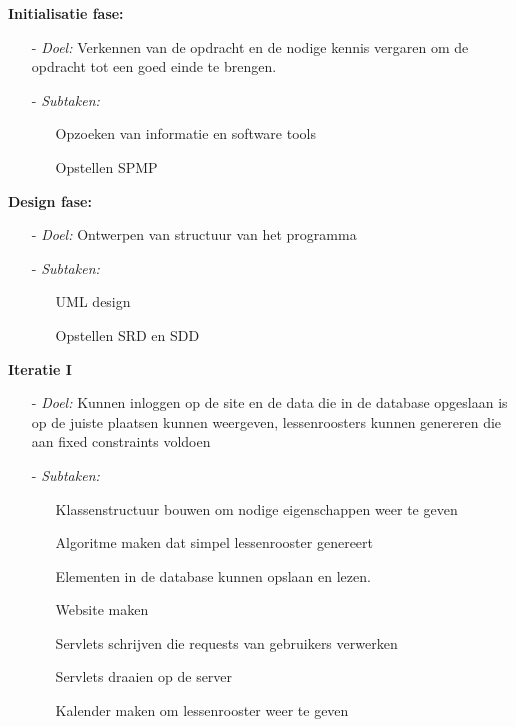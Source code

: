 \documentclass{article}
\begin{document}
\textbf{Initialisatie fase:}
\begin{itemize}
\item[-] \textit{Doel:} Verkennen van de opdracht en de nodige kennis vergaren om de opdracht tot een goed einde te brengen. \\[-5mm]
\item[-] \textit{Subtaken:}\\[-5mm]
\begin{itemize}
	\item[] Opzoeken van informatie en software tools\\[-5mm]
	\item[] Opstellen SPMP\\[-5mm]
\end{itemize}
\end{itemize}

\textbf{Design fase:}
\begin{itemize}
\item[-] \textit{Doel:} Ontwerpen van structuur van het programma \\[-5mm]
\item[-] \textit{Subtaken:}\\[-5mm]
\begin{itemize}
	\item[] UML design\\[-5mm]
	\item[]Opstellen SRD en SDD\\[-5mm]
\end{itemize}

\end{itemize}

\textbf{Iteratie I}
\begin{itemize}
\item[-] \textit{Doel:} Kunnen inloggen op de site en de data die in de database opgeslaan is op de juiste plaatsen kunnen weergeven, lessenroosters kunnen genereren die aan fixed constraints voldoen\\[-5mm]
\item[-] \textit{Subtaken:} \\[-5mm]
\begin{itemize}
	\item[] Klassenstructuur bouwen om nodige eigenschappen weer te geven \\[-5mm]
	\item[] Algoritme maken dat simpel lessenrooster genereert \\[-5mm]
	\item[] Elementen in de database kunnen opslaan en lezen. \\[-5mm]
	\item[] Website maken \\[-5mm]
	\item[] Servlets schrijven die requests van gebruikers verwerken \\[-5mm]
	\item[] Servlets draaien op de server \\[-5mm]
	\item[] Kalender maken om lessenrooster weer te geven \\[-5mm]
\end{itemize}
\end{itemize}
\end{document}
